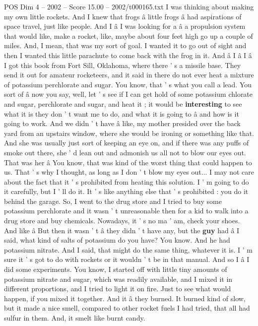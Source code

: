 \begin{textsample}{POS Dim 4 – 2002 – Score 15.00 – 2002/t000165.txt}
I was thinking about making my own little rockets.
And I knew that frogs â little frogs â had aspirations of space travel, just like people.
And I â I was looking for a â a propulsion system that would like, make a rocket, like, maybe about four feet high go up a couple of miles.
And, I mean, that was my sort of goal.
I wanted it to go out of sight and then I wanted this little parachute to come back with the frog in it.
And â I â I â I got this book from Fort Sill, Oklahoma, where there ' s a missile base.
They send it out for amateur rocketeers, and it said in there do not ever heat a mixture of potassium perchlorate and sugar.
You know, that ' s what you call a lead.
You sort of â now you say, well, let ' s see if I can get hold of some potassium chlorate and sugar, perchlorate and sugar, and heat it ; it would be \textbf{interesting} to see what it is they don ' t want me to do, and what it is going to â and how is it going to work.
And we didn ' t have â like, my mother presided over the back yard from an upstairs window, where she would be ironing or something like that.
And she was usually just sort of keeping an eye on, and if there was any puffs of smoke out there, she ' d lean out and admonish us all not to blow our eyes out.
That was her â You know, that was kind of the worst thing that could happen to us.
That ' s why I thought, as long as I don ' t blow my eyes out...
I may not care about the fact that it ' s prohibited from heating this solution.
I ' m going to do it carefully, but I ' ll do it.
It ' s like anything else that ' s prohibited : you do it behind the garage.
So, I went to the drug store and I tried to buy some potassium perchlorate and it wasn ' t unreasonable then for a kid to walk into a drug store and buy chemicals.
Nowadays, it ' s no ma ' am, check your shoes.
And like â But then it wasn ' t â they didn ' t have any, but the \textbf{guy} had â I said, what kind of salts of potassium do you have?
You know.
And he had potassium nitrate.
And I said, that might do the same thing, whatever it is.
I ' m sure it ' s got to do with rockets or it wouldn ' t be in that manual.
And so I â I did some experiments.
You know, I started off with little tiny amounts of potassium nitrate and sugar, which was readily available, and I mixed it in different proportions, and I tried to light it on fire.
Just to see what would happen, if you mixed it together.
And it â they burned.
It burned kind of slow, but it made a nice smell, compared to other rocket fuels I had tried, that all had sulfur in them.
And, it smelt like burnt candy.

\end{textsample}
